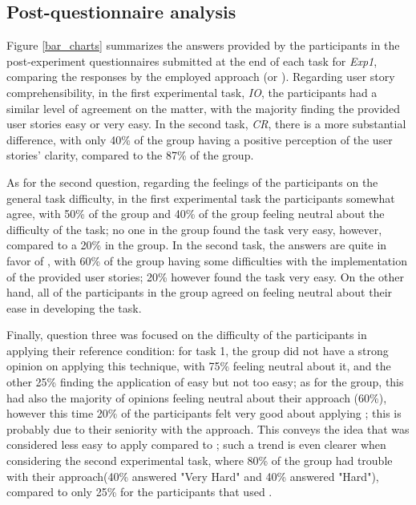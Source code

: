 \subsection{Post-questionnaire analysis}
Figure \ref{bar_charts} summarizes the answers provided by the participants in the post-experiment questionnaires submitted at the end of each task for \textit{Exp1}, comparing the responses by the employed approach (\tdd or \notdd).
Regarding user story comprehensibility, in the first experimental task, \textit{IO}, the participants had a similar level of agreement on the matter, with the majority finding the provided user stories easy or very easy. In the second task, \textit{CR}, there is a more substantial difference, with only 40\% of the \tdd group having a positive perception of the user stories' clarity, compared to the 87\% of the \notdd group.

As for the second question, regarding the feelings of the participants on the general task difficulty, in the first experimental task the participants somewhat agree, with 50\% of the \tdd group and 40\% of the \notdd group feeling neutral about the difficulty of the task; no one in the \tdd group found the task very easy, however, compared to a 20\% in the \notdd group. In the second task, the answers are quite in favor of \notdd, with 60\% of the \tdd group having some difficulties with the implementation of the provided user stories; 20\% however found the task very easy. On the other hand, all of the participants in the \notdd group agreed on feeling neutral about their ease in developing the task.

Finally, question three was focused on the difficulty of the participants in applying their reference condition: for task 1, the \tdd group did not have a strong opinion on applying this technique, with 75\% feeling neutral about it, and the other 25\% finding the application of \tdd easy but not too easy; as for the \notdd group, this had also the majority of opinions feeling neutral about their approach (60\%), however this time 20\% of the participants felt very good about applying \notdd; this is probably due to their seniority with the approach. This conveys the idea that \tdd was considered less easy to apply compared to \notdd; such a trend is even clearer when considering the second experimental task, where 80\% of the \tdd group had trouble with their approach(40\% answered "Very Hard" and 40\% answered "Hard"), compared to only 25\% for the participants that used \notdd.


